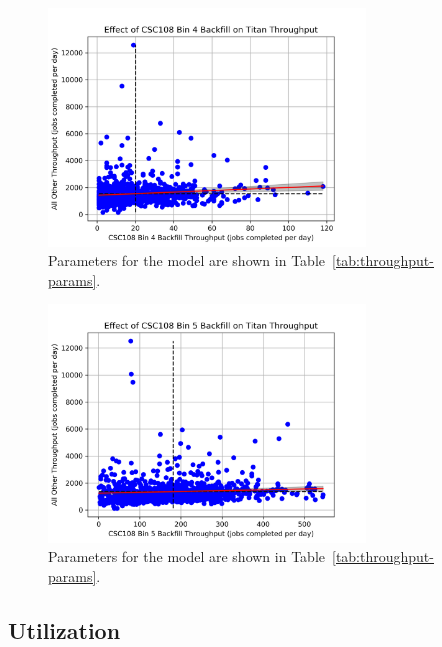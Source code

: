 \begin{figure}
  \includegraphics[width=0.75\textwidth]{images/linfit-throughput-bin4.png}
\caption{Parameters for the model are shown in
    Table~\ref{tab:throughput-params}.}
\label{fig:throughput-bin4}
\end{figure}

\begin{figure}
  \includegraphics[width=0.75\textwidth]{images/linfit-throughput-bin5.png}
\caption{Parameters for the model are shown in
    Table~\ref{tab:throughput-params}.}
\label{fig:throughput-bin5}
\end{figure}


\subsection{Utilization}
\label{subsec:utilization}

